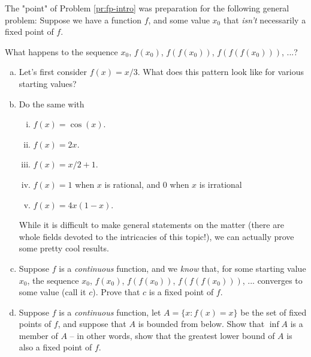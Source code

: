 \begin{problem}
\label{pr:fp-iter}


The "point" of Problem \ref{pr:fp-intro} was preparation for the following general problem: Suppose we have a function $f$, and some value $x_0$ that \textit{isn't} necessarily a fixed point of $f$.

What happens to the sequence $x_0$, $f(x_0)$, $f(f(x_0))$, $f(f(f(x_0)))$, ...? %

\begin{enumerate}[(a)]
\item Let's first consider $f(x) = x/3$. What does this pattern look like for various starting values?
\item Do the same with 
\begin{enumerate}[i.]
\item $f(x) = \cos(x)$.
\item $f(x) = 2x$. 
\item $f(x) = x/2 + 1$. 
\item $f(x) = 1$ when $x$ is rational, and 0 when $x$ is irrational
\item $f(x) = 4x(1-x)$. %
\end{enumerate} \hfill

While it is difficult to make general statements on the matter (there are whole fields devoted to the intricacies of this topic!), we can actually prove some pretty cool results.



\item Suppose $f$ is a \emph{continuous} function, and we \emph{know} that, for some starting value $x_0$, the sequence $x_0$, $f(x_0)$, $f(f(x_0))$, $f(f(f(x_0)))$, ... converges to some value (call it $c$). Prove that $c$ is a fixed point of $f$.

\item Suppose $f$ is a \emph{continuous} function, let $A = \{x : f(x) = x\}$ be the set of fixed points of $f$, and suppose that $A$ is bounded from below. Show that $\inf A$ is a member of $A$ -- in other words, show that the greatest lower bound of $A$ is also a fixed point of $f$.




\end{enumerate}
\end{problem}
